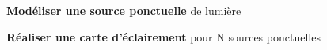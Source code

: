 \item \textbf{Modéliser une source ponctuelle} de lumière
\item \textbf{Réaliser une carte d'éclairement} pour N sources ponctuelles